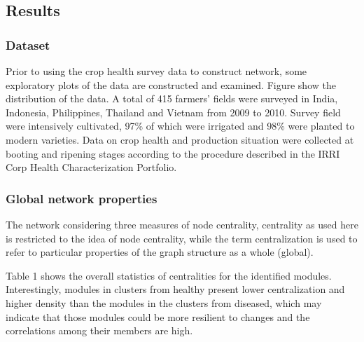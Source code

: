 \subsection{Results}

\subsubsection{Dataset}

Prior to using the crop health survey data to construct network, some exploratory plots of the data are constructed and examined. Figure show the distribution of the data. A total of 415 farmers' fields were surveyed in India, Indonesia, Philippines, Thailand and Vietnam from 2009 to 2010. Survey field were intensively cultivated, 97\% of which were irrigated and 98\% were planted to modern varieties. Data on crop health and production situation were collected at booting and ripening stages according to the procedure described in the IRRI Corp Health Characterization Portfolio\cite{Savary_2009_Survey}. 



\subsubsection*{Global network properties}

The network considering three measures of node centrality, centrality as used here is restricted to the idea of node centrality, while the term centralization is used to refer to particular properties of the graph structure as a whole (global).

Table 1 shows the overall statistics of centralities for the identified modules. Interestingly, modules in clusters from healthy  present lower centralization and higher density than the modules in the clusters from diseased, which may indicate that those modules could be more resilient to changes and the correlations among their members are high.


